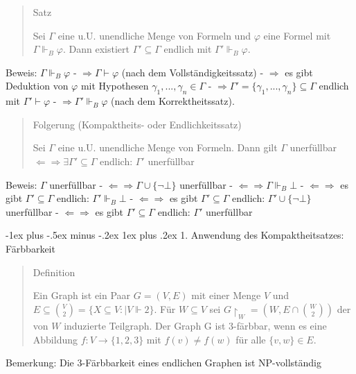 \documentclass[a4paper]{article}
\makeatletter
\renewcommand{\subsubsection}{\@startsection{subsubsection}{3}{0mm}%
                {-1ex plus -.5ex minus -.2ex}%
                {1ex plus .2ex}%
                {\normalfont\small\bfseries}}
\makeatother
\begin{document}
\begin{multicols}{3}
  \begin{quote}
    Satz

    Sei $\Gamma$ eine u.U. unendliche Menge von Formeln und $\varphi$ eine
    Formel mit $\Gamma\Vdash_B\varphi$. Dann existiert
    $\Gamma'\subseteq\Gamma$ endlich mit $\Gamma'\Vdash_B \varphi$.
  \end{quote}

  Beweis: $\Gamma\Vdash_B\varphi$ - $\Rightarrow\Gamma\vdash\varphi$ (nach
  dem Vollständigkeitssatz) - $\Rightarrow$ es gibt Deduktion von
  $\varphi$ mit Hypothesen $\gamma_1,...,\gamma_n\in\Gamma$ -
  $\Rightarrow\Gamma'=\{\gamma_1,...,\gamma_n\}\subseteq\Gamma$ endlich
  mit $\Gamma'\vdash\varphi$ - $\Rightarrow\Gamma'\Vdash_B\varphi$ (nach
  dem Korrektheitssatz).

  \begin{quote}
    Folgerung (Kompaktheits- oder Endlichkeitssatz)

    Sei $\Gamma$ eine u.U. unendliche Menge von Formeln. Dann gilt $\Gamma$
    unerfüllbar $\Leftarrow\Rightarrow\exists\Gamma'\subseteq\Gamma$
    endlich: $\Gamma'$ unerfüllbar
  \end{quote}

  Beweis: $\Gamma$ unerfüllbar -
  $\Leftarrow\Rightarrow\Gamma\cup\{\lnot\bot\}$ unerfüllbar -
  $\Leftarrow\Rightarrow\Gamma\Vdash_B\bot$ - $\Leftarrow\Rightarrow$ es
  gibt $\Gamma'\subseteq\Gamma$ endlich: $\Gamma'\Vdash_B\bot$ -
  $\Leftarrow\Rightarrow$ es gibt $\Gamma'\subseteq\Gamma$ endlich:
  $\Gamma'\cup\{\lnot\bot\}$ unerfüllbar - $\Leftarrow\Rightarrow$ es gibt
  $\Gamma'\subseteq\Gamma$ endlich: $\Gamma'$ unerfüllbar

  \subsubsection{1. Anwendung des Kompaktheitsatzes:
    Färbbarkeit}\label{anwendung-des-kompaktheitsatzes-fuxe4rbbarkeit}

  \begin{quote}
    Definition

    Ein Graph ist ein Paar $G=(V,E)$ mit einer Menge $V$ und
    $E\subseteq\binom{V}{2} =\{X\subseteq V:|V\Vdash 2\}$. Für $W\subseteq V$ sei $G\upharpoonright_W= (W,E\cap\binom{W}{2})$
    der von $W$ induzierte Teilgraph. Der Graph G ist 3-färbbar, wenn es
    eine Abbildung $f:V\rightarrow\{1,2,3\}$ mit $f(v)\not=f(w)$ für alle
    $\{v,w\}\in E$.
  \end{quote}

  Bemerkung: Die 3-Färbbarkeit eines endlichen Graphen ist NP-vollständig


\end{multicols}
\end{document}
